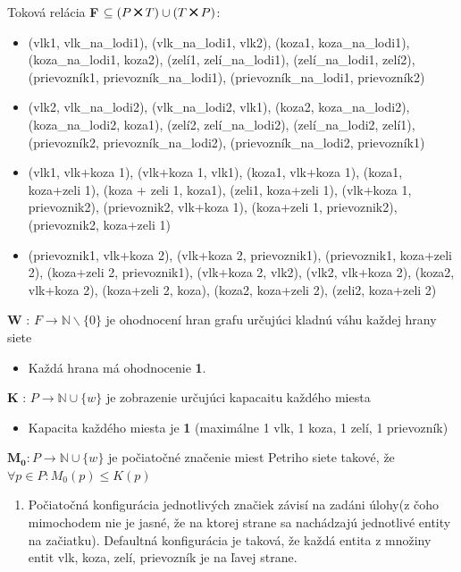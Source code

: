 \documentclass[11pt,a4paper]{article}
\newcommand{\Cross}{\mathbin{\tikz [x=1.4ex,y=1.4ex,line width=.2ex] \draw (0,0) -- (1,1) (0,1) -- (1,0);}}
\begin{document}
Toková relácia  \textbf{F} $ \subseteq (P \Cross T) \cup (T \Cross P) $:
\begin{itemize}
    \item (vlk1, vlk\_na\_lodi1), (vlk\_na\_lodi1, vlk2), (koza1, koza\_na\_lodi1), (koza\_na\_lodi1, koza2), (zelí1, zelí\_na\_lodi1), (zelí\_na\_lodi1, zelí2), (prievozník1, prievozník\_na\_lodi1), (prievozník\_na\_lodi1, prievozník2)
    \item (vlk2, vlk\_na\_lodi2), (vlk\_na\_lodi2, vlk1), (koza2, koza\_na\_lodi2), (koza\_na\_lodi2, koza1), (zelí2, zelí\_na\_lodi2), (zelí\_na\_lodi2, zelí1), (prievozník2, prievozník\_na\_lodi2), (prievozník\_na\_lodi2, prievozník1)
    \item (vlk1, vlk+koza 1), (vlk+koza 1, vlk1), (koza1, vlk+koza 1), (koza1, koza+zeli 1), (koza + zeli 1, koza1), (zeli1, koza+zeli 1), (vlk+koza 1, prievoznik2), (prievoznik2, vlk+koza 1), (koza+zeli 1, prievoznik2), (prievoznik2, koza+zeli 1)
    \item (prievoznik1, vlk+koza 2), (vlk+koza 2, prievoznik1), (prievoznik1, koza+zeli 2), (koza+zeli 2, prievoznik1), (vlk+koza 2, vlk2), (vlk2, vlk+koza 2), (koza2, vlk+koza 2), (koza+zeli 2, koza), (koza2, koza+zeli 2), (zeli2, koza+zeli 2)
\end{itemize}

\textbf{W} : $ F \rightarrow \mathbb N  \backslash \{0\}$ je ohodnocení hran grafu určujúci kladnú váhu každej hrany siete
\begin{itemize}
    \item Každá hrana má ohodnocenie \textbf{1}.
\end{itemize}

\textbf{K} : $ P \rightarrow \mathbb N \cup \{w\} $ je zobrazenie určujúci kapacaitu každého miesta
\begin{itemize}
    \item Kapacita každého miesta je \textbf{1} (maximálne 1 vlk, 1 koza, 1 zelí, 1 prievozník)
\end{itemize}

$\mathbf{M_0} : P \rightarrow \mathbb N \cup \{w\} $ je počiatočné značenie miest Petriho siete takové, že $ \forall p \in P: M_0(p) \leq K(p) $
 
\begin{enumerate}
    \item Počiatočná konfigurácia jednotlivých značiek závisí na zadáni úlohy(z čoho mimochodem nie je jasné, že na ktorej strane sa nachádzajú jednotlivé entity na začiatku). Defaultná konfigurácia je taková, že každá entita z množiny entit {vlk, koza, zelí, prievozník} je na ľavej strane.
\end{enumerate}
\end{document}
